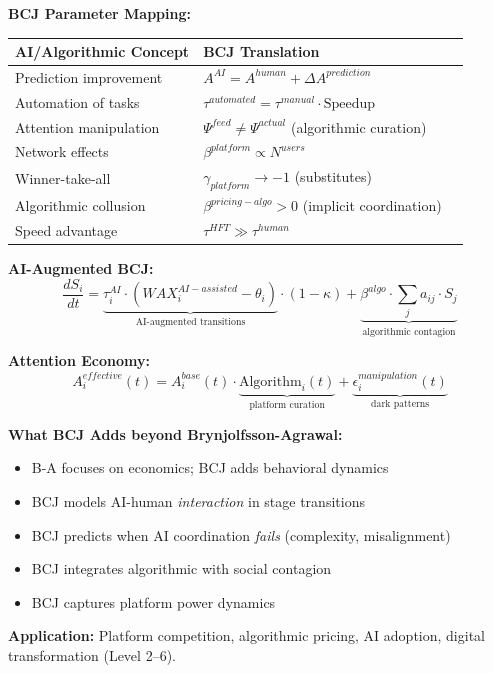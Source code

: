 \begin{tcolorbox}[colback=magenta!5!white, colframe=magenta!75!black,
    title=Theorem BCJ-T45: Algorithmic Coordination as Special Case]
\textbf{BCJ Parameter Mapping:}
\begin{center}
\begin{tabular}{lll}
\toprule
\textbf{AI/Algorithmic Concept} & \textbf{BCJ Translation} \\
\midrule
Prediction improvement & $A^{AI} = A^{human} + \Delta A^{prediction}$ \\
Automation of tasks & $\tau^{automated} = \tau^{manual} \cdot \text{Speedup}$ \\
Attention manipulation & $\Psi^{feed} \neq \Psi^{actual}$ (algorithmic curation) \\
Network effects & $\beta^{platform} \propto N^{users}$ \\
Winner-take-all & $\gamma_{platform} \to -1$ (substitutes) \\
Algorithmic collusion & $\beta^{pricing-algo} > 0$ (implicit coordination) \\
Speed advantage & $\tau^{HFT} \gg \tau^{human}$ \\
\bottomrule
\end{tabular}
\end{center}

\textbf{AI-Augmented BCJ:}
\begin{equation}
\frac{dS_i}{dt} = \underbrace{\tau^{AI}_i \cdot (WAX_i^{AI-assisted} - \theta_i)}_{\text{AI-augmented transitions}} \cdot (1-\kappa) + \underbrace{\beta^{algo} \cdot \sum_j a_{ij} \cdot S_j}_{\text{algorithmic contagion}}
\end{equation}

\textbf{Attention Economy:}
\begin{equation}
A_i^{effective}(t) = A_i^{base}(t) \cdot \underbrace{\text{Algorithm}_i(t)}_{\text{platform curation}} + \underbrace{\epsilon^{manipulation}_i(t)}_{\text{dark patterns}}
\end{equation}

\textbf{What BCJ Adds beyond Brynjolfsson-Agrawal:}
\begin{itemize}[nosep]
\item B-A focuses on economics; BCJ adds behavioral dynamics
\item BCJ models AI-human \textit{interaction} in stage transitions
\item BCJ predicts when AI coordination \textit{fails} (complexity, misalignment)
\item BCJ integrates algorithmic with social contagion
\item BCJ captures platform power dynamics
\end{itemize}

\textbf{Application:} Platform competition, algorithmic pricing, AI adoption, digital transformation (Level 2--6).
\end{tcolorbox}

